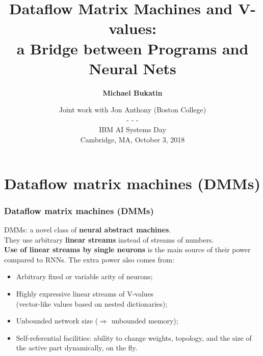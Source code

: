 \documentclass{beamer}
\newcommand{\msmagenta}[1]{{\color{mymagenta} #1}}
\begin{document}
\title{Dataflow Matrix Machines and V-values:\\ a Bridge between Programs and Neural Nets}
\author{\bf Michael Bukatin}
\date[]  
{\small Joint work with Jon Anthony (Boston College)\\
 - - -\\
{IBM AI Systems Day\\
Cambridge, MA, October 3, 2018}}

\begin{frame}
  \initclock
  \titlepage
\end{frame}

\section{Dataflow matrix machines (DMMs)}

\begin{frame}

  \frametitle{\msmagenta{Dataflow matrix machines (DMMs)}}

DMMs: a novel class of {\bf neural abstract machines}.\\[2ex]

They use arbitrary {\bf linear streams} instead of streams of numbers.\\[2ex]

{\bf Use of linear streams by single neurons} is the main source of their power compared to RNNs.
The extra power also comes from:\\[1ex]

\begin{itemize}

\item Arbitrary fixed or variable arity of neurons;\\[2ex]

\item Highly expressive linear streams of V-values\\ (vector-like values based on nested dictionaries);\\[2ex]

\item Unbounded network size ($\Rightarrow$ unbounded memory);\\[2ex]

\item Self-referential facilities: ability to change weights, topology, and the size of the active part dynamically, on the fly.

\end{itemize}

\end{frame}
\end{document}
